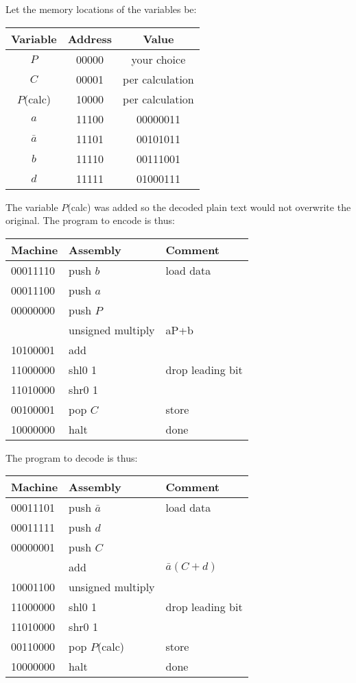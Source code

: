 Let the memory locations of the variables be:

\noindent\begin{tabular}{|c|c|c|}
  \hline
  Variable & Address & Value \\ \hline
  $P$      & 00000 & your choice \\ \hline
  $C$      & 00001 & per calculation \\ \hline
  $P$(calc)& 10000 & per calculation \\ \hline
  $a$      & 11100 & 00000011 \\ \hline
  $\bar a$ & 11101 & 00101011 \\ \hline
  $b$      & 11110 & 00111001 \\ \hline
  $d$      & 11111 & 01000111 \\ \hline
\end{tabular}

The variable $P$(calc) was added so the decoded plain text would not overwrite the original.  The program to encode is thus:

\begin{tabular}{l|l@{ ;}l}
  Machine & Assembly & Comment \\
  \hline
  00011110 & push $b$ & load data \\
  00011100 & push $a$ &  \\
  00000000 & push $P$ &  \\
           & unsigned multiply & aP+b \\
  10100001 & add      &  \\
  11000000 & shl0 1   & drop leading bit \\
  11010000 & shr0 1   &  \\
  00100001 & pop $C$  & store \\
  10000000 & halt     & done \\
\end{tabular}

The program to decode is thus:

\begin{tabular}{l|l@{ ;}l}
  Machine & Assembly & Comment \\
  \hline
  00011101 & push $\bar a$     & load data \\
  00011111 & push $d$          &  \\
  00000001 & push $C$          &  \\
           & add               & $\bar a(C+d)$ \\
  10001100 & unsigned multiply &  \\
  11000000 & shl0 1            & drop leading bit \\
  11010000 & shr0 1            &  \\
  00110000 & pop $P$(calc)     & store \\
  10000000 & halt              & done \\
\end{tabular}


